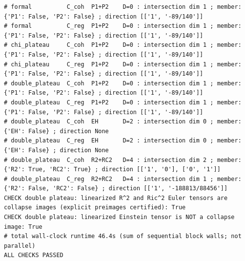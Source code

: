\documentclass{article}
\theoremstyle{remark}
\begin{document}
\begin{lstlisting}
# formal          C_coh  P1+P2    D=0 : intersection dim 1 ; member: {'P1': False, 'P2': False} ; direction [['1', '-89/140']]
# formal          C_reg  P1+P2    D=0 : intersection dim 1 ; member: {'P1': False, 'P2': False} ; direction [['1', '-89/140']]
# chi_plateau     C_coh  P1+P2    D=0 : intersection dim 1 ; member: {'P1': False, 'P2': False} ; direction [['1', '-89/140']]
# chi_plateau     C_reg  P1+P2    D=0 : intersection dim 1 ; member: {'P1': False, 'P2': False} ; direction [['1', '-89/140']]
# double_plateau  C_coh  P1+P2    D=0 : intersection dim 1 ; member: {'P1': False, 'P2': False} ; direction [['1', '-89/140']]
# double_plateau  C_reg  P1+P2    D=0 : intersection dim 1 ; member: {'P1': False, 'P2': False} ; direction [['1', '-89/140']]
# double_plateau  C_coh  EH       D=2 : intersection dim 0 ; member: {'EH': False} ; direction None
# double_plateau  C_reg  EH       D=2 : intersection dim 0 ; member: {'EH': False} ; direction None
# double_plateau  C_coh  R2+RC2   D=4 : intersection dim 2 ; member: {'R2': True, 'RC2': True} ; direction [['1', '0'], ['0', '1']]
# double_plateau  C_reg  R2+RC2   D=4 : intersection dim 1 ; member: {'R2': False, 'RC2': False} ; direction [['1', '-188813/88456']]
CHECK double plateau: linearized R^2 and Ric^2 Euler tensors are collapse images (explicit preimages certified): True
CHECK double plateau: linearized Einstein tensor is NOT a collapse image: True
# total wall-clock runtime 46.4s (sum of sequential block walls; not parallel)
ALL CHECKS PASSED
\end{lstlisting}
\end{document}
